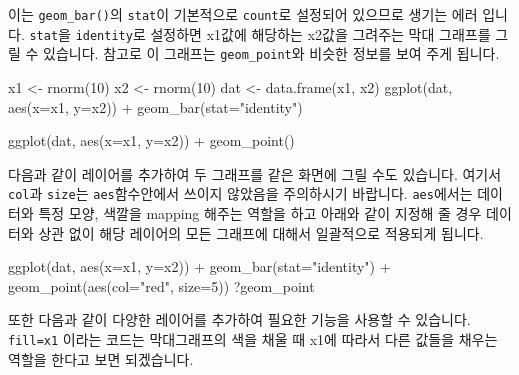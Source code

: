 \documentclass[
]{book}
\newenvironment{Shaded}{\begin{snugshade}}{\end{snugshade}}
\newcommand{\AttributeTok}[1]{\textcolor[rgb]{0.77,0.63,0.00}{#1}}
\newcommand{\DecValTok}[1]{\textcolor[rgb]{0.00,0.00,0.81}{#1}}
\newcommand{\FunctionTok}[1]{\textcolor[rgb]{0.00,0.00,0.00}{#1}}
\newcommand{\NormalTok}[1]{#1}
\newcommand{\OtherTok}[1]{\textcolor[rgb]{0.56,0.35,0.01}{#1}}
\newcommand{\SpecialCharTok}[1]{\textcolor[rgb]{0.00,0.00,0.00}{#1}}
\newcommand{\StringTok}[1]{\textcolor[rgb]{0.31,0.60,0.02}{#1}}
\begin{document}
이는 \texttt{geom\_bar()}의 \texttt{stat}이 기본적으로 \texttt{count}로 설정되어 있으므로 생기는 에러 입니다. \texttt{stat}을 \texttt{identity}로 설정하면 x1값에 해당하는 x2값을 그려주는 막대 그래프를 그릴 수 있습니다. 참고로 이 그래프는 \texttt{geom\_point}와 비슷한 정보를 보여 주게 됩니다.

\begin{Shaded}
\begin{Highlighting}[]
\NormalTok{x1 }\OtherTok{\textless{}{-}} \FunctionTok{rnorm}\NormalTok{(}\DecValTok{10}\NormalTok{)}
\NormalTok{x2 }\OtherTok{\textless{}{-}} \FunctionTok{rnorm}\NormalTok{(}\DecValTok{10}\NormalTok{)}
\NormalTok{dat }\OtherTok{\textless{}{-}} \FunctionTok{data.frame}\NormalTok{(x1, x2)}
\FunctionTok{ggplot}\NormalTok{(dat, }\FunctionTok{aes}\NormalTok{(}\AttributeTok{x=}\NormalTok{x1, }\AttributeTok{y=}\NormalTok{x2)) }\SpecialCharTok{+}
  \FunctionTok{geom\_bar}\NormalTok{(}\AttributeTok{stat=}\StringTok{"identity"}\NormalTok{)}

\FunctionTok{ggplot}\NormalTok{(dat, }\FunctionTok{aes}\NormalTok{(}\AttributeTok{x=}\NormalTok{x1, }\AttributeTok{y=}\NormalTok{x2)) }\SpecialCharTok{+}
  \FunctionTok{geom\_point}\NormalTok{()}
\end{Highlighting}
\end{Shaded}

다음과 같이 레이어를 추가하여 두 그래프를 같은 화면에 그릴 수도 있습니다. 여기서 \texttt{col}과 \texttt{size}는 \texttt{aes}함수안에서 쓰이지 않았음을 주의하시기 바랍니다. \texttt{aes}에서는 데이터와 특정 모양, 색깔을 mapping 해주는 역할을 하고 아래와 같이 지정해 줄 경우 데이터와 상관 없이 해당 레이어의 모든 그래프에 대해서 일괄적으로 적용되게 됩니다.

\begin{Shaded}
\begin{Highlighting}[]
\FunctionTok{ggplot}\NormalTok{(dat, }\FunctionTok{aes}\NormalTok{(}\AttributeTok{x=}\NormalTok{x1, }\AttributeTok{y=}\NormalTok{x2)) }\SpecialCharTok{+}
  \FunctionTok{geom\_bar}\NormalTok{(}\AttributeTok{stat=}\StringTok{"identity"}\NormalTok{) }\SpecialCharTok{+}
  \FunctionTok{geom\_point}\NormalTok{(}\FunctionTok{aes}\NormalTok{(}\AttributeTok{col=}\StringTok{"red"}\NormalTok{, }\AttributeTok{size=}\DecValTok{5}\NormalTok{))}
\NormalTok{?geom\_point}
\end{Highlighting}
\end{Shaded}

또한 다음과 같이 다양한 레이어를 추가하여 필요한 기능을 사용할 수 있습니다. \texttt{fill=x1} 이라는 코드는 막대그래프의 색을 채울 때 x1에 따라서 다른 값들을 채우는 역할을 한다고 보면 되겠습니다.
\end{document}
